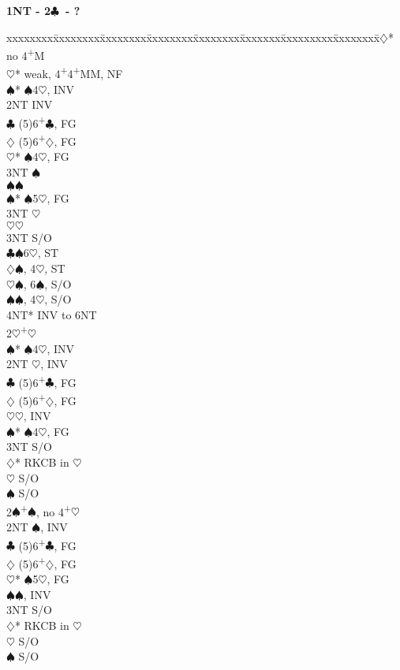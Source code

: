 \documentclass[10pt]{article}
\renewcommand{\c}{$\clubsuit$}
\renewcommand{\d}{$\diamondsuit$}
\newcommand{\h}{$\heartsuit$}
\newcommand{\s}{$\spadesuit$}
\newcommand{\p}{\textsuperscript{+}}
\newcommand{\m}{\textsuperscript{\textminus}}
\newenvironment{bidtable}[1][]
{\textbf{#1}
  \begin{adjustwidth}{1em}{}
    \addvspace{2pt}
    \begin{tabbing}
      xxxxxxxx\=xxxxxxxx\=xxxxxxxx\=xxxxxxxx\=xxxxxxxx\=xxxxxxx\=xxxxxxxxx\=xxxxxxxx\=\kill}
{\end{tabbing}\end{adjustwidth}\bigskip}%
\begin{document}
\begin{bidtable}[1NT - 2\c\ - ?]
2\d* \> no 4\p M                     \\
     \h* \> weak, 4\p 4\p MM, NF \\
     \s* {}\s 4\h, INV         \\
     \> 2NT  \> INV                  \\
     \c  \> (5)6\p\c, FG         \\ %
     \d  \> (5)6\p\d, FG         \\ %
     \h* {}\s 4\h, FG          \\
     \>      \> 3NT \s           \\
     \>      \s {}\s           \\
     \s* {}\s 5\h, FG          \\
     \>      \> 3NT \h           \\
     \>      \h {}\h           \\
     \> 3NT  \> S/O                  \\
     \c  {}\s 6\h, ST\\
     \d  {}\s, 4\h, ST\\
     \h  {}\s, 6\s, S/O\\
     \s  {}\s, 4\h, S/O\\
     \> 4NT* \> INV to 6NT           \\
2\h  {}\p\h                        \\
     \s* {}\s 4\h, INV         \\
     \> 2NT  \m\h, INV           \\
     \c  \> (5)6\p\c, FG         \\
     \d  \> (5)6\p\d, FG         \\
     \h  {}\h, INV             \\
     \s* {}\s 4\h, FG          \\ %
     \> 3NT  \> S/O                  \\
     \d* \> RKCB in \h           \\
     \h  \> S/O                  \\
     \s  \> S/O                  \\
2\s  {}\p\s, no 4\p\h              \\
     \> 2NT  \m\s, INV           \\
     \c  \> (5)6\p\c, FG         \\
     \d  \> (5)6\p\d, FG         \\
     \h* {}\s 5\h, FG          \\
     \s  {}\s, INV             \\
     \> 3NT  \> S/O                  \\
     \d* \> RKCB in \h           \\
     \h  \> S/O                  \\
     \s  \> S/O
\end{bidtable}
\end{document}

